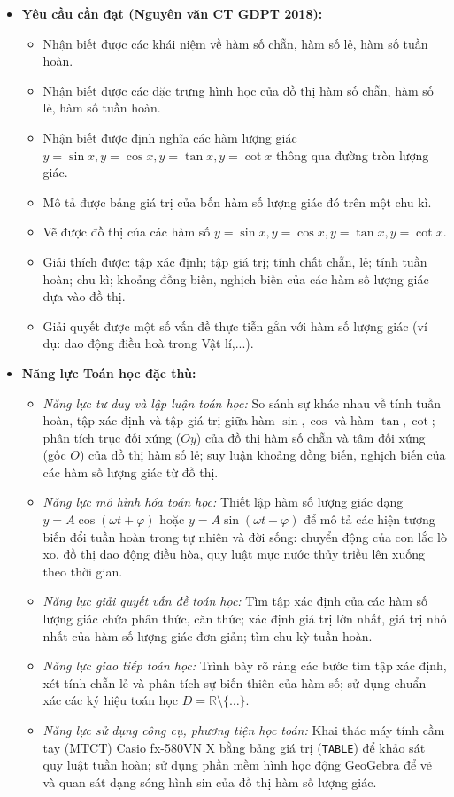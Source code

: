 \documentclass[12pt, a4paper]{article}
\begin{document}
\begin{itemize}[leftmargin=1.2cm]
    \item \textbf{Yêu cầu cần đạt (Nguyên văn CT GDPT 2018):}
    \begin{itemize}[leftmargin=0.6cm]
        \item Nhận biết được các khái niệm về hàm số chẵn, hàm số lẻ, hàm số tuần hoàn.
        \item Nhận biết được các đặc trưng hình học của đồ thị hàm số chẵn, hàm số lẻ, hàm số tuần hoàn.
        \item Nhận biết được định nghĩa các hàm lượng giác $y = \sin x, y = \cos x, y = \tan x, y = \cot x$ thông qua đường tròn lượng giác.
        \item Mô tả được bảng giá trị của bốn hàm số lượng giác đó trên một chu kì.
        \item Vẽ được đồ thị của các hàm số $y = \sin x, y = \cos x, y = \tan x, y = \cot x$.
        \item Giải thích được: tập xác định; tập giá trị; tính chất chẵn, lẻ; tính tuần hoàn; chu kì; khoảng đồng biến, nghịch biến của các hàm số lượng giác dựa vào đồ thị.
        \item Giải quyết được một số vấn đề thực tiễn gắn với hàm số lượng giác (ví dụ: dao động điều hoà trong Vật lí,...).
    \end{itemize}

    \item \textbf{Năng lực Toán học đặc thù:}
    \begin{itemize}[leftmargin=0.6cm]
        \item \textit{Năng lực tư duy và lập luận toán học:} So sánh sự khác nhau về tính tuần hoàn, tập xác định và tập giá trị giữa hàm $\sin, \cos$ và hàm $\tan, \cot$; phân tích trục đối xứng ($Oy$) của đồ thị hàm số chẵn và tâm đối xứng (gốc $O$) của đồ thị hàm số lẻ; suy luận khoảng đồng biến, nghịch biến của các hàm số lượng giác từ đồ thị.
        \item \textit{Năng lực mô hình hóa toán học:} Thiết lập hàm số lượng giác dạng $y = A \cos(\omega t + \varphi)$ hoặc $y = A \sin(\omega t + \varphi)$ để mô tả các hiện tượng biến đổi tuần hoàn trong tự nhiên và đời sống: chuyển động của con lắc lò xo, đồ thị dao động điều hòa, quy luật mực nước thủy triều lên xuống theo thời gian.
        \item \textit{Năng lực giải quyết vấn đề toán học:} Tìm tập xác định của các hàm số lượng giác chứa phân thức, căn thức; xác định giá trị lớn nhất, giá trị nhỏ nhất của hàm số lượng giác đơn giản; tìm chu kỳ tuần hoàn.
        \item \textit{Năng lực giao tiếp toán học:} Trình bày rõ ràng các bước tìm tập xác định, xét tính chẵn lẻ và phân tích sự biến thiên của hàm số; sử dụng chuẩn xác các ký hiệu toán học $D = \mathbb{R} \setminus \{\dots\}$.
        \item \textit{Năng lực sử dụng công cụ, phương tiện học toán:} Khai thác máy tính cầm tay (MTCT) Casio fx-580VN X bằng bảng giá trị (\texttt{TABLE}) để khảo sát quy luật tuần hoàn; sử dụng phần mềm hình học động GeoGebra để vẽ và quan sát dạng sóng hình sin của đồ thị hàm số lượng giác.
    \end{itemize}


\end{itemize}
\end{document}
